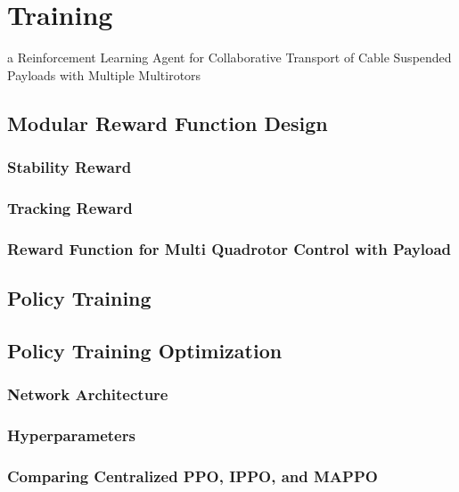 \chapter{Training}
a Reinforcement Learning Agent for Collaborative Transport of Cable Suspended Payloads with Multiple Multirotors
\section{Modular Reward Function Design}
\subsection{Stability Reward}
\subsection{Tracking Reward}
\subsection{Reward Function for Multi Quadrotor Control with Payload}

\section{Policy Training}
\section{Policy Training Optimization}
\subsection{Network Architecture}
\subsection{Hyperparameters}
\subsection{Comparing Centralized PPO, IPPO, and MAPPO}




